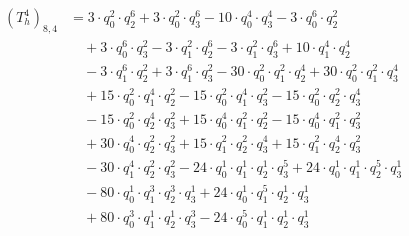 \begin{align*}(T_{h}^4)_{8,4}&=3\cdot q_0^{2}\cdot q_2^{6}+3\cdot q_0^{2}\cdot q_3^{6}-10\cdot q_0^{4}\cdot q_3^{4}-3\cdot q_0^{6}\cdot q_2^{2}\\
&\quad +3\cdot q_0^{6}\cdot q_3^{2}-3\cdot q_1^{2}\cdot q_2^{6}-3\cdot q_1^{2}\cdot q_3^{6}+10\cdot q_1^{4}\cdot q_2^{4}\\
&\quad -3\cdot q_1^{6}\cdot q_2^{2}+3\cdot q_1^{6}\cdot q_3^{2}-30\cdot q_0^{2}\cdot q_1^{2}\cdot q_2^{4}+30\cdot q_0^{2}\cdot q_1^{2}\cdot q_3^{4}\\
&\quad +15\cdot q_0^{2}\cdot q_1^{4}\cdot q_2^{2}-15\cdot q_0^{2}\cdot q_1^{4}\cdot q_3^{2}-15\cdot q_0^{2}\cdot q_2^{2}\cdot q_3^{4}\\
&\quad -15\cdot q_0^{2}\cdot q_2^{4}\cdot q_3^{2}+15\cdot q_0^{4}\cdot q_1^{2}\cdot q_2^{2}-15\cdot q_0^{4}\cdot q_1^{2}\cdot q_3^{2}\\
&\quad +30\cdot q_0^{4}\cdot q_2^{2}\cdot q_3^{2}+15\cdot q_1^{2}\cdot q_2^{2}\cdot q_3^{4}+15\cdot q_1^{2}\cdot q_2^{4}\cdot q_3^{2}\\
&\quad -30\cdot q_1^{4}\cdot q_2^{2}\cdot q_3^{2}-24\cdot q_0^{1}\cdot q_1^{1}\cdot q_2^{1}\cdot q_3^{5}+24\cdot q_0^{1}\cdot q_1^{1}\cdot q_2^{5}\cdot q_3^{1}\\
&\quad -80\cdot q_0^{1}\cdot q_1^{3}\cdot q_2^{3}\cdot q_3^{1}+24\cdot q_0^{1}\cdot q_1^{5}\cdot q_2^{1}\cdot q_3^{1}\\
&\quad +80\cdot q_0^{3}\cdot q_1^{1}\cdot q_2^{1}\cdot q_3^{3}-24\cdot q_0^{5}\cdot q_1^{1}\cdot q_2^{1}\cdot q_3^{1}\end{align*}
